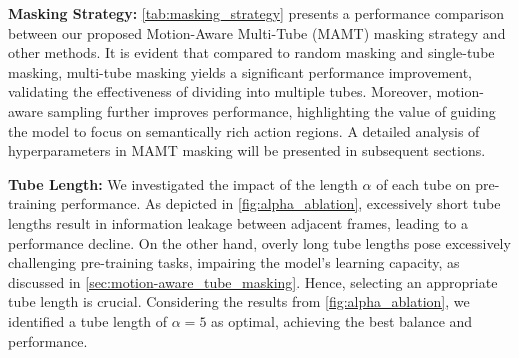 \noindent \textbf{Masking Strategy:}
\cref{tab:masking_strategy} presents a performance comparison between our
proposed Motion-Aware Multi-Tube (MAMT) masking strategy and other methods.
It is evident that compared to random masking and single-tube masking,
multi-tube masking yields a significant performance improvement,
validating the effectiveness of dividing into multiple tubes.
Moreover, motion-aware sampling
further improves performance, highlighting the value of guiding the model to focus
on semantically rich action regions. A detailed analysis of hyperparameters in
MAMT masking will be presented in subsequent sections.

\noindent \textbf{Tube Length:}
We investigated the impact of the length $\alpha$ of each tube on pre-training performance.
As depicted in \cref{fig:alpha_ablation}, excessively short tube lengths result
in information leakage between adjacent frames, leading to a performance decline.
On the other hand, overly long tube lengths pose excessively challenging pre-training
tasks, impairing the model's learning capacity, as discussed in \cref{sec:motion-aware_tube_masking}.
Hence, selecting an appropriate tube length is crucial. Considering the results
from \cref{fig:alpha_ablation}, we identified a tube length of $\alpha=5$ as
optimal, achieving the best balance and performance.

